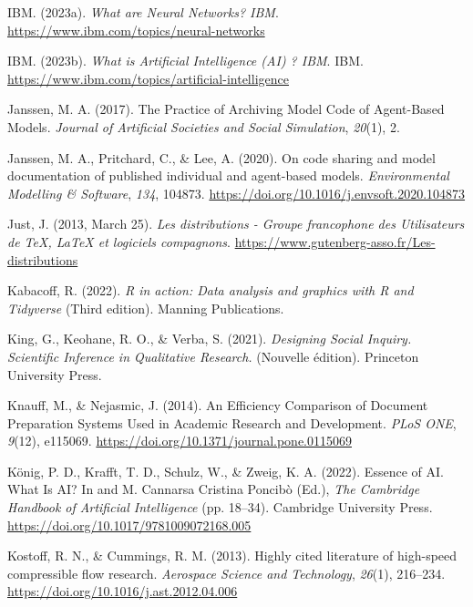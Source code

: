 \documentclass[
  letterpaper,
  DIV=11,
  numbers=noendperiod]{scrreprt}
\newlength{\cslhangindent}
\newlength{\cslentryspacingunit} %
\newenvironment{CSLReferences}[2] %
 {%
  \setlength{\parindent}{0pt}
  \ifodd #1
  \let\oldpar\par
  \def\par{\hangindent=\cslhangindent\oldpar}
  \fi
  \setlength{\parskip}{#2\cslentryspacingunit}
 }%
 {}
\begin{document}
\begin{CSLReferences}{1}{0}
\leavevmode{}%
IBM. (2023a). \emph{What are {Neural Networks}? \textbar{} {IBM}}.
\url{https://www.ibm.com/topics/neural-networks}

\leavevmode{}%
IBM. (2023b). \emph{What is {Artificial Intelligence} ({AI}) ?
\textbar{} {IBM}}. IBM.
\url{https://www.ibm.com/topics/artificial-intelligence}

\leavevmode{}%
Janssen, M. A. (2017). The {Practice} of {Archiving Model Code} of
{Agent-Based Models}. \emph{Journal of Artificial Societies and Social
Simulation}, \emph{20}(1), 2.

\leavevmode{}%
Janssen, M. A., Pritchard, C., \& Lee, A. (2020). On code sharing and
model documentation of published individual and agent-based models.
\emph{Environmental Modelling \& Software}, \emph{134}, 104873.
\url{https://doi.org/10.1016/j.envsoft.2020.104873}

\leavevmode{}%
Just, J. (2013, March 25). \emph{Les distributions - {Groupe}
francophone des {Utilisateurs} de {TeX}, {LaTeX} et logiciels
compagnons}. \url{https://www.gutenberg-asso.fr/Les-distributions}

\leavevmode{}%
Kabacoff, R. (2022). \emph{R in action: Data analysis and graphics with
{R} and {Tidyverse}} (Third edition). Manning Publications.

\leavevmode{}%
King, G., Keohane, R. O., \& Verba, S. (2021). \emph{Designing {Social
Inquiry}. {Scientific Inference} in {Qualitative Research}.} (Nouvelle
édition). Princeton University Press.

\leavevmode{}%
Knauff, M., \& Nejasmic, J. (2014). An {Efficiency Comparison} of
{Document Preparation Systems Used} in {Academic Research} and
{Development}. \emph{PLoS ONE}, \emph{9}(12), e115069.
\url{https://doi.org/10.1371/journal.pone.0115069}

\leavevmode{}%
König, P. D., Krafft, T. D., Schulz, W., \& Zweig, K. A. (2022). Essence
of {AI}. {What Is AI}? In and M. Cannarsa Cristina Poncibò (Ed.),
\emph{The {Cambridge Handbook} of {Artificial Intelligence}} (pp.
18--34). Cambridge University Press.
\url{https://doi.org/10.1017/9781009072168.005}

\leavevmode{}%
Kostoff, R. N., \& Cummings, R. M. (2013). Highly cited literature of
high-speed compressible flow research. \emph{Aerospace Science and
Technology}, \emph{26}(1), 216--234.
\url{https://doi.org/10.1016/j.ast.2012.04.006}


\end{CSLReferences}
\end{document}
